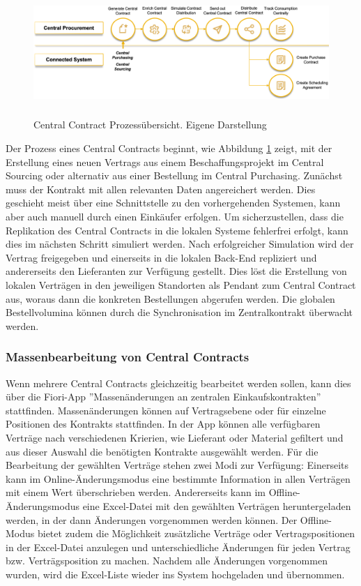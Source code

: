 \begin{figure}[H]
    \centering
    \includegraphics[height=4.76cm]{Bilder/Central_Contract_Process3.png}
    \caption[Central Contract Prozessübersicht]{Central Contract Prozessübersicht. Eigene Darstellung}
    \label{fig:Central_Contract_Process3}
\end{figure}

Der Prozess eines Central Contracts beginnt, wie Abbildung \ref{fig:Central_Contract_Process3} zeigt, mit der Erstellung eines neuen Vertrags aus einem Beschaffungsprojekt im Central Sourcing oder alternativ aus einer Bestellung im Central Purchasing. Zunächst muss der Kontrakt mit allen relevanten Daten angereichert werden. Dies geschieht meist über eine Schnittstelle zu den vorhergehenden Systemen, kann aber auch manuell durch einen Einkäufer erfolgen. Um sicherzustellen, dass die Replikation des Central Contracts in die lokalen Systeme fehlerfrei erfolgt, kann dies im nächsten Schritt simuliert werden. Nach erfolgreicher Simulation wird der Vertrag freigegeben und einerseits in die lokalen Back-End repliziert und andererseits den Lieferanten zur Verfügung gestellt. Dies löst die Erstellung von lokalen Verträgen in den jeweiligen Standorten als Pendant zum Central Contract aus, woraus dann die konkreten Bestellungen abgerufen werden. Die globalen Bestellvolumina können durch die Synchronisation im Zentralkontrakt überwacht werden.

\subsubsection{Massenbearbeitung von Central Contracts}

Wenn mehrere Central Contracts gleichzeitig bearbeitet werden sollen, kann dies über die Fiori-App ''Massenänderungen an zentralen Einkaufskontrakten'' stattfinden. Massenänderungen können auf Vertragsebene oder für einzelne Positionen des Kontrakts stattfinden. In der App können alle verfügbaren Verträge nach verschiedenen Krierien, wie \zB Lieferant oder Material gefiltert und aus dieser Auswahl die benötigten Kontrakte ausgewählt werden. Für die Bearbeitung der gewählten Verträge stehen zwei Modi zur Verfügung: Einerseits kann im Online-Änderungsmodus eine bestimmte Information in allen Verträgen mit einem Wert überschrieben werden. Andererseits kann im Offline-Änderungsmodus eine Excel-Datei mit den gewählten Verträgen heruntergeladen werden, in der dann Änderungen vorgenommen werden können. Der Offline-Modus bietet zudem die Möglichkeit zusätzliche Verträge oder Vertragspositionen in der Excel-Datei anzulegen und unterschiedliche Änderungen für jeden Vertrag bzw. Verträgsposition zu machen. Nachdem alle Änderungen vorgenommen wurden, wird die Excel-Liste wieder ins System hochgeladen und übernommen.